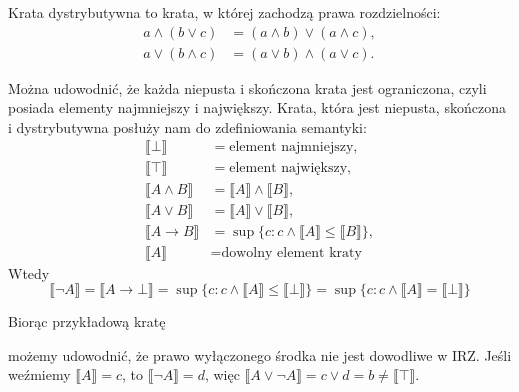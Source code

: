 \documentclass[polish,pretty]{angav}
\begin{document}
Krata dystrybutywna to krata, w której zachodzą prawa rozdzielności:
\begin{align*}
    a \land (b \lor c) &= (a \land b) \lor (a \land c), \\
    a \lor (b \land c) &= (a \lor b) \land (a \lor c).
\end{align*}

Można udowodnić, że każda niepusta i skończona krata jest ograniczona, czyli posiada elementy najmniejszy i największy. Krata, która jest niepusta, skończona i dystrybutywna posłuży nam do zdefiniowania semantyki:
\begin{align*}
    \llbracket \bot \rrbracket &= \text{element najmniejszy}, \\
    \llbracket \top \rrbracket &= \text{element największy}, \\
    \llbracket A \land B \rrbracket &= \llbracket A \rrbracket \land \llbracket B \rrbracket, \\
    \llbracket A \lor B \rrbracket &= \llbracket A \rrbracket \lor \llbracket B \rrbracket, \\
    \llbracket A \to B \rrbracket &= \sup\{c : c \land \llbracket A \rrbracket \leq \llbracket B \rrbracket\}, \\
    \llbracket A \rrbracket &= \text{dowolny element kraty}
\end{align*}
Wtedy
\[ \llbracket \neg A \rrbracket = \llbracket A \to \bot \rrbracket = \sup\{c : c \land \llbracket A \rrbracket \leq \llbracket \bot \rrbracket\} = \sup\{c : c \land \llbracket A \rrbracket = \llbracket \bot \rrbracket\} \]

Biorąc przykładową kratę
\begin{figure}[H]
    \centering
\end{figure}
możemy udowodnić, że prawo wyłączonego środka nie jest dowodliwe w IRZ. Jeśli weźmiemy $\llbracket A \rrbracket = c$, to $\llbracket \neg A \rrbracket = d$, więc $\llbracket A \lor \neg A \rrbracket = c \lor d = b \neq \llbracket \top \rrbracket$.
\end{document}
